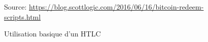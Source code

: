 \begin{figure}[h!]
    \centering

    {\scriptsize
            Source: \url{https://blog.scottlogic.com/2016/06/16/bitcoin-redeem-scripts.html}}
    \caption{Utilisation basique d'un HTLC}
    \label{fig:HTLC}
\end{figure}
